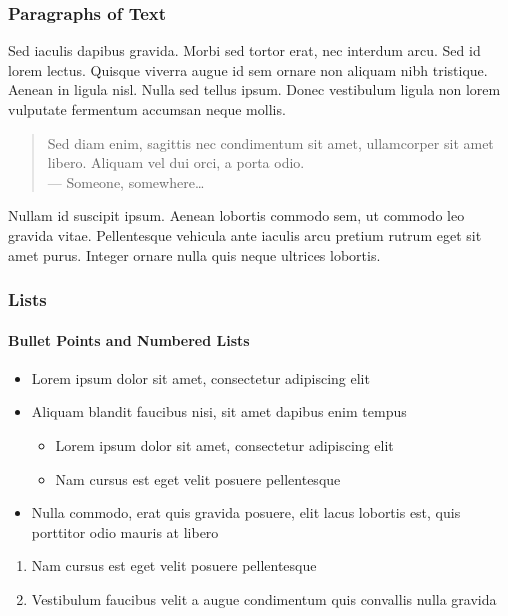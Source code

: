 \documentclass[
	11pt, %
]{beamer}
\begin{document}
\begin{frame}
	\frametitle{Paragraphs of Text}
	
	Sed iaculis \alert{dapibus gravida}. Morbi sed tortor erat, nec interdum arcu. Sed id lorem lectus. Quisque viverra augue id sem ornare non aliquam nibh tristique. Aenean in ligula nisl. Nulla sed tellus ipsum. Donec vestibulum ligula non lorem vulputate fermentum accumsan neque mollis.
	
	\bigskip %
	
	\begin{quote}
		Sed diam enim, sagittis nec condimentum sit amet, ullamcorper sit amet libero. Aliquam vel dui orci, a porta odio.\\
		--- Someone, somewhere\ldots
	\end{quote}
	
	\bigskip %
	
	Nullam id suscipit ipsum. Aenean lobortis commodo sem, ut commodo leo gravida vitae. Pellentesque vehicula ante iaculis arcu pretium rutrum eget sit amet purus. Integer ornare nulla quis neque ultrices lobortis.
\end{frame}


\begin{frame}
	\frametitle{Lists}
	\framesubtitle{Bullet Points and Numbered Lists} %
	
	\begin{itemize}
		\item Lorem ipsum dolor sit amet, consectetur adipiscing elit
		\item Aliquam blandit faucibus nisi, sit amet dapibus enim tempus
		\begin{itemize}
			\item Lorem ipsum dolor sit amet, consectetur adipiscing elit
			\item Nam cursus est eget velit posuere pellentesque
		\end{itemize}
		\item Nulla commodo, erat quis gravida posuere, elit lacus lobortis est, quis porttitor odio mauris at libero
	\end{itemize}
	
	\bigskip %
	
	\begin{enumerate}
		\item Nam cursus est eget velit posuere pellentesque
		\item Vestibulum faucibus velit a augue condimentum quis convallis nulla gravida 
	\end{enumerate}
\end{frame}
\end{document}
